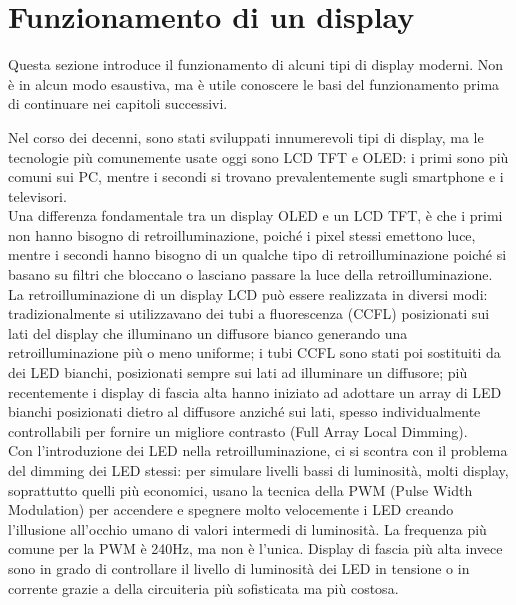 \section{Funzionamento di un display}
Questa sezione introduce il funzionamento di alcuni tipi di display moderni. Non è in alcun modo esaustiva, ma è utile conoscere le basi del funzionamento prima di continuare nei capitoli successivi.

Nel corso dei decenni, sono stati sviluppati innumerevoli tipi di display, ma le tecnologie più comunemente usate oggi sono LCD TFT e OLED: i primi sono più comuni sui PC, mentre i secondi si trovano prevalentemente sugli smartphone e i televisori.\\
Una differenza fondamentale tra un display OLED e un LCD TFT, è che i primi non hanno bisogno di retroilluminazione, poiché i pixel stessi emettono luce, mentre i secondi hanno bisogno di un qualche tipo di retroilluminazione poiché si basano su filtri che bloccano o lasciano passare la luce della retroilluminazione.\\
La retroilluminazione di un display LCD può essere realizzata in diversi modi: tradizionalmente si utilizzavano dei tubi a fluorescenza (CCFL) posizionati sui lati del display che illuminano un diffusore bianco generando una retroilluminazione più o meno uniforme; i tubi CCFL sono stati poi sostituiti da dei LED bianchi, posizionati sempre sui lati ad illuminare un diffusore; più recentemente i display di fascia alta hanno iniziato ad adottare un array di LED bianchi posizionati dietro al diffusore anziché sui lati, spesso individualmente controllabili per fornire un migliore contrasto (Full Array Local Dimming).\\
Con l'introduzione dei LED nella retroilluminazione, ci si scontra con il problema del dimming dei LED stessi: per simulare livelli bassi di luminosità, molti display, soprattutto quelli più economici, usano la tecnica della PWM (Pulse Width Modulation) per accendere e spegnere molto velocemente i LED creando l'illusione all'occhio umano di valori intermedi di luminosità. La frequenza più comune per la PWM è 240Hz, ma non è l'unica. Display di fascia più alta invece sono in grado di controllare il livello di luminosità dei LED in tensione o in corrente grazie a della circuiteria più sofisticata ma più costosa.

